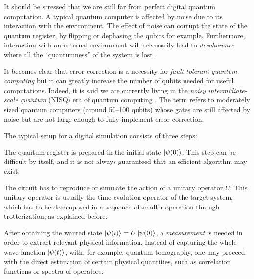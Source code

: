 \medskip

It should be stressed that we are still far from perfect digital quantum computation.
A typical quantum computer is affected by noise due to its interaction with the environment.
The effect of noise can corrupt the state of the quantum register, by flipping or dephasing the qubits for example.
Furthermore, interaction with an external environment will necessarily lead to \emph{decoherence} where all the ``quantumness'' of the system is lost \cite{zurek1991decoherence, schlosshauer2014decoherence, schlosshauer2019decoherence}.

It becomes clear that error correction is a necessity for \emph{fault-tolerant quantum computing} \cite{preskill1997faulttolerant, shor1996faulttolerant} but it can greatly increase the number of qubits needed for useful computations.
Indeed, it is said we are currently living in the \emph{noisy intermidiate-scale quantum} (NISQ) era of quantum computing \cite{preskill2018quantumcomputing}.
The term refers to moderately sized quantum computers (around 50--100 qubits) whose gates are still affected by noise but are not large enough to fully implement error correction.

\medskip

The typical setup for a digital simulation consists of three steps:
\begin{description}[font=\normalfont\itshape, labelsep=1.1em]
    \item[Initial-state preparation.] The quantum register is prepared in the initial state $\ket{\psi(0)}$.
        This step can be difficult by itself, and it is not always guaranteed that an efficient algorithm may exist.

    \item[Unitary evolution.] The circuit has to reproduce or simulate the action of a unitary operator $U$.
        This unitary operator is usually the time-evolution operator of the target system, which has to be decomposed in a sequence of smaller operation through trotterization, as explained before.

    \item[Final measurement.] After obtaining the wanted state $\ket{\psi(t)} = U \ket{\psi(0)}$, a \emph{measurement} is needed in order to extract relevant physical information.
        Instead of capturing the whole wave function $\ket{\psi(t)}$, with, for example, quantum tomography, one may proceed with the direct estimation of certain physical quantities, such as correlation functions or spectra of operators.
\end{description}


